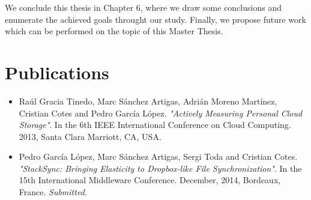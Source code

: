 We conclude this thesis in Chapter 6, where we draw some conclusions and enumerate the achieved goals throught our study. Finally, we propose future work which can be performed on the topic of this Master Thesis.

\section{Publications}

\begin{itemize}
\item Ra{\'u}l Gracia Tinedo, Marc S{\'a}nchez Artigas, Adri{\'a}n Moreno Mart{\'i}nez, Cristian Cotes and Pedro Garc{\'i}a L{\'o}pez. \textit{"Actively Measuring Personal Cloud Storage"}. In the 6th IEEE International Conference on Cloud Computing. 2013, Santa Clara Marriott, CA, USA.

\item Pedro Garc{\'i}a L{\'o}pez, Marc S{\'a}nchez Artigas, Sergi Toda and Cristian Cotes. \textit{"StackSync: Bringing Elasticity to Dropbox-like File Synchronization"}. In the 15th International Middleware Conference. December, 2014, Bordeaux, France. \textit{Submitted.}
\end{itemize}